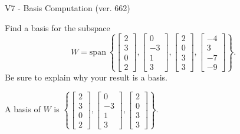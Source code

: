 \begin{exercise}
  \begin{exerciseTitle}V7 - Basis Computation (ver. 662)\end{exerciseTitle}
  \begin{exerciseStatement}
    Find a basis for the subspace 
\[W=\mathrm{span}\ \left\{\left[\begin{array}{r}
2 \\
3 \\
0 \\
2
\end{array}\right] , \left[\begin{array}{r}
0 \\
-3 \\
1 \\
3
\end{array}\right] , \left[\begin{array}{r}
2 \\
0 \\
3 \\
3
\end{array}\right] , \left[\begin{array}{r}
-4 \\
3 \\
-7 \\
-9
\end{array}\right]\right\}.\]
 Be sure to explain why your result is a basis.


  \end{exerciseStatement}
  \begin{exerciseAnswer}
   A basis of \(W\) is  \(\left\{\left[\begin{array}{r}
2 \\
3 \\
0 \\
2
\end{array}\right] , \left[\begin{array}{r}
0 \\
-3 \\
1 \\
3
\end{array}\right] , \left[\begin{array}{r}
2 \\
0 \\
3 \\
3
\end{array}\right]\right\}\).
  


  \end{exerciseAnswer}
\end{exercise}